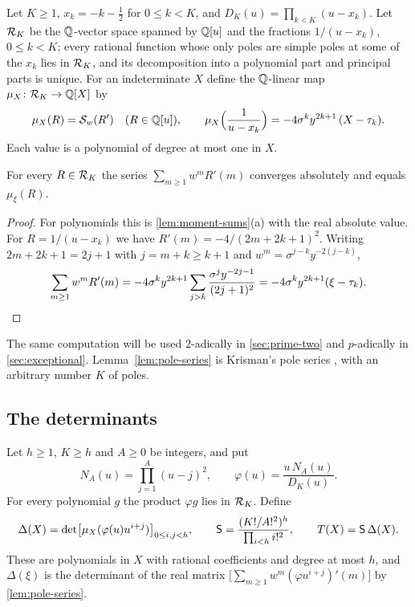 Let $K\ge1$, $x_k=-k-\frac12$ for $0\le k<K$, and $D_K(u)=\prod_{k<K}(u-x_k)$. Let $\mathcal{R}_K$ be
the $\mathbb{Q}$-vector space spanned by $\mathbb{Q}[u]$ and the fractions $1/(u-x_k)$, $0\le k<K$; every
rational function whose only poles are simple poles at some of the $x_k$ lies in $\mathcal{R}_K$, and
its decomposition into a polynomial part and principal parts is unique. For an indeterminate
$X$ define the $\mathbb{Q}$-linear map $\mu_X\colon\mathcal{R}_K\to\mathbb{Q}[X]$ by
\begin{equation}\label{eq:functional}
  \mu_X(R)=\mathcal{S}_w(R')\quad(R\in\mathbb{Q}[u]),\qquad
  \mu_X\Bigl(\frac1{u-x_k}\Bigr)=-4\sigma^ky^{2k+1}\,(X-\tau_k).
\end{equation}
Each value is a polynomial of degree at most one in $X$.

\begin{lemma}\label{lem:pole-series}
For every $R\in\mathcal{R}_K$ the series $\sum_{m\ge1}w^mR'(m)$ converges absolutely and equals
$\mu_\xi(R)$.
\end{lemma}

\begin{proof}
For polynomials this is \cref{lem:moment-sums}(a) with the real absolute value. For
$R=1/(u-x_k)$ we have $R'(m)=-4/(2m+2k+1)^2$. Writing $2m+2k+1=2j+1$ with $j=m+k\ge k+1$
and $w^m=\sigma^{j-k}y^{-2(j-k)}$,
\[
  \sum_{m\ge1}w^mR'(m)=-4\sigma^ky^{2k+1}\sum_{j>k}\frac{\sigma^jy^{-2j-1}}{(2j+1)^2}
  =-4\sigma^ky^{2k+1}(\xi-\tau_k).\qedhere
\]
\end{proof}

The same computation will be used $2$-adically in \cref{sec:prime-two} and $p$-adically in
\cref{sec:exceptional}. Lemma~\ref{lem:pole-series} is Krisman's pole series
\cite[Lemma~2.1]{Krisman2026chi2}, with an arbitrary number $K$ of poles.

\subsection{The determinants}\label{subsec:determinants}

Let $h\ge1$, $K\ge h$ and $A\ge0$ be integers, and put
\begin{equation}\label{eq:phi}
  N_A(u)=\prod_{j=1}^A(u-j)^2,\qquad \varphi(u)=\frac{u\,N_A(u)}{D_K(u)}.
\end{equation}
For every polynomial $g$ the product $\varphi g$ lies in $\mathcal{R}_K$. Define
\begin{equation}\label{eq:Delta-T}
  \Delta(X)=\det\bigl[\mu_X(\varphi(u)u^{i+j})\bigr]_{0\le i,j<h},\qquad
  \mathsf{S}=\frac{(K!/A!^2)^h}{\prod_{i<h}i!^2},\qquad T(X)=\mathsf{S}\,\Delta(X).
\end{equation}
These are polynomials in $X$ with rational coefficients and degree at most $h$, and
$\Delta(\xi)$ is the determinant of the real matrix
$\bigl[\sum_{m\ge1}w^m(\varphi u^{i+j})'(m)\bigr]$ by \cref{lem:pole-series}.


